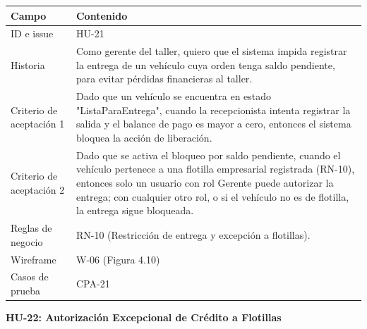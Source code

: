 {\def\LTcaptype{none} %
\begin{longtable}[]{@{}
  >{\raggedright\arraybackslash}p{}
  >{\raggedright\arraybackslash}p{}@{}}
\toprule\noalign{}
\begin{minipage}[b]{\linewidth}\raggedright
\textbf{Campo}
\end{minipage} & \begin{minipage}[b]{\linewidth}\raggedright
\textbf{Contenido}
\end{minipage} \\
\midrule\noalign{}
\endhead
\bottomrule\noalign{}
\endlastfoot
ID e issue & HU-21 \\
Historia & Como gerente del taller, quiero que el sistema impida
registrar la entrega de un vehículo cuya orden tenga saldo pendiente,
para evitar pérdidas financieras al taller. \\
Criterio de aceptación 1 & Dado que un vehículo se encuentra en estado
"ListaParaEntrega", cuando la recepcionista intenta registrar la
salida y el balance de pago es mayor a cero, entonces el sistema bloquea
la acción de liberación. \\
Criterio de aceptación 2 & Dado que se activa el bloqueo por saldo
pendiente, cuando el vehículo pertenece a una flotilla empresarial
registrada (RN-10), entonces solo un usuario con rol Gerente puede
autorizar la entrega; con cualquier otro rol, o si el vehículo no es de
flotilla, la entrega sigue bloqueada. \\
Reglas de negocio & RN-10 (Restricción de entrega y excepción a
flotillas). \\
Wireframe & W-06 (Figura 4.10) \\
Casos de prueba & CPA-21 \\
\end{longtable}
}

\textbf{HU-22: Autorización Excepcional de Crédito a Flotillas}

